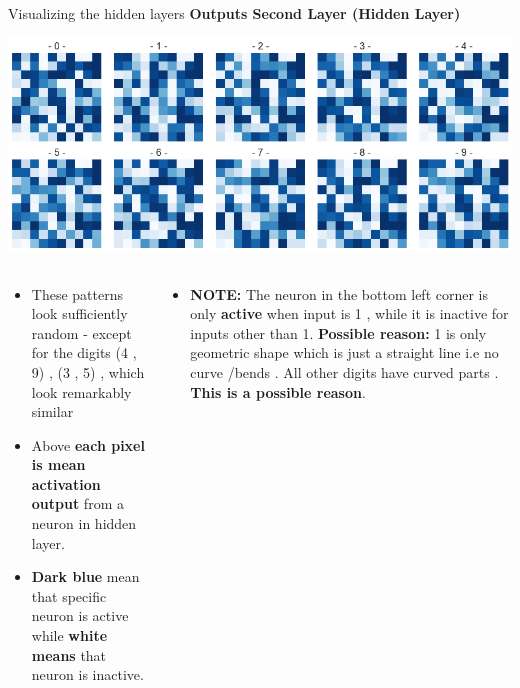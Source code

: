\documentclass[12pt,t]{beamer}
\begin{document}
\begin{frame}[t]{Visualizing the hidden layers}
    \scriptsize
   \textbf{ Outputs Second Layer (Hidden Layer) }

    \centering
    \includegraphics[width=0.8\linewidth]{neuron_outputs/second_layer.png}
    \begin{columns}
        \begin{column}[]{0.6\linewidth}
            \begin{itemize}
                \item These patterns look sufficiently random - except for the digits (4 , 9) , (3 , 5) , which look remarkably similar
                \item Above \textbf{each pixel is mean activation output} from a neuron in hidden layer.
                \item \textbf{Dark blue} mean that specific neuron is active while \textbf{white means} that neuron is inactive.
            \end{itemize}            
        \end{column}

        \begin{column}[]{0.55\linewidth}
            \begin{itemize}
                \item \textbf{NOTE:} The neuron in the bottom left corner 
                is only \textbf{active} when input 
                is 1 , while it is inactive for inputs other than 1. \textbf{Possible reason:} 1 is 
                only geometric shape which is just a straight line i.e no curve /bends . All other digits 
                have curved parts . \textbf{This is a possible reason}.
            \end{itemize}
        \end{column}

    \end{columns}
\end{frame}
\end{document}
